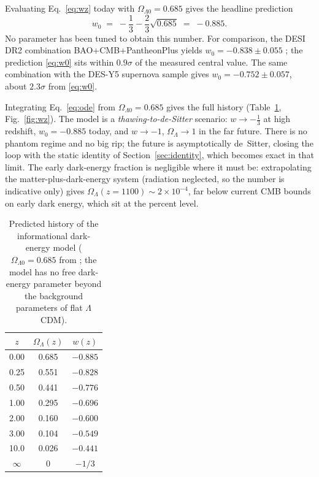 \documentclass[11pt,a4paper]{article}
\begin{document}
Evaluating Eq.~\eqref{eq:wz} today with $\Omega_{\Lambda 0}=0.685$
\citep{Planck2018} gives the headline prediction
\begin{equation}
w_0 \;=\; -\frac13 - \frac23\sqrt{0.685} \;=\; -0.885 .
\label{eq:w0}
\end{equation}
No parameter has been tuned to obtain this number. For comparison, the DESI
DR2 combination BAO+CMB+PantheonPlus yields $w_0 = -0.838 \pm 0.055$
\citep{DESIDR2}; the prediction \eqref{eq:w0} sits within $0.9\sigma$ of the
measured central value. The same combination with the DES-Y5 supernova
sample gives $w_0 = -0.752 \pm 0.057$, about $2.3\sigma$ from \eqref{eq:w0}.

Integrating Eq.~\eqref{eq:ode} from $\Omega_{\Lambda0}=0.685$ gives the full
history (Table~\ref{tab:wz}, Fig.~\ref{fig:wz}). The model is a
\emph{thawing-to-de-Sitter} scenario: $w \to -\tfrac13$ at high redshift,
$w_0=-0.885$ today, and $w\to -1$, $\Omega_\Lambda \to 1$ in the far future.
There is no phantom regime and no big rip; the future is asymptotically
de~Sitter, closing the loop with the static identity of
Section~\ref{sec:identity}, which becomes exact in that limit. The early
dark-energy fraction is negligible where it must be: extrapolating the
matter-plus-dark-energy system (radiation neglected, so the number is
indicative only) gives $\Omega_\Lambda(z{=}1100) \sim 2\times10^{-4}$,
far below current CMB bounds on early dark energy, which sit at the percent
level.

\begin{table}[t]
\centering
\caption{Predicted history of the informational dark-energy model
($\Omega_{\Lambda0}=0.685$ from \citep{Planck2018}; the model has no free dark-energy parameter beyond the background parameters of flat $\Lambda$CDM).}
\label{tab:wz}
\begin{tabular}{ccc}
\toprule
$z$ & $\Omega_\Lambda(z)$ & $w(z)$\\
\midrule
0.00 & 0.685 & $-0.885$\\
0.25 & 0.551 & $-0.828$\\
0.50 & 0.441 & $-0.776$\\
1.00 & 0.295 & $-0.696$\\
2.00 & 0.160 & $-0.600$\\
3.00 & 0.104 & $-0.549$\\
10.0 & 0.026 & $-0.441$\\
$\infty$ & 0 & $-1/3$\\
\bottomrule
\end{tabular}
\end{table}
\end{document}
